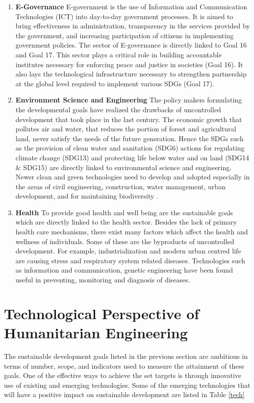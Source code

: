 \documentclass[10pt]{IETBook}
\begin{document}
\begin{enumerate}
 \item {\bf E-Governance} E-government is the use of Information and Communication Technologies (ICT) into day-to-day government processes. It is aimed to bring effectiveness in administration, transparency in the services provided by the government, and increasing participation of citizens in implementing government policies. The sector of E-governance is directly linked to Goal 16 and Goal 17. This sector plays a critical role in building accountable institutes necessary for enforcing peace and justice in societies (Goal 16). It also lays the technological infrastructure necessary to strengthen partnership at the global level required to implement various SDGs (Goal 17). \cite{ndou2004government,lim2016government}
 
 \item {\bf Environment Science and Engineering}
 The policy makers formulating the developmental goals have realized the drawbacks of uncontrolled development that took place in the last century. The economic growth that pollutes air and water, that reduces the portion of forest and agricultural land, never satisfy the needs of the future generation. Hence the SDGs such as the provision of clean water and sanitation (SDG6) actions for regulating climate change (SDG13) and protecting life below water and on land (SDG14 \& SDG15) are directly linked to environmental science and engineering. Newer clean and green technologies need to develop and adopted especially in the areas of civil engineering, construction, water management, urban development, and for maintaining biodiversity \cite{clayton2018sustainability}.

 \item {\bf Health}
 To provide good health and well being are the sustainable goals which are directly linked to the health sector. Besides the lack of primary health care mechanisms, there exist many factors which affect the health and wellness of individuals. Some of these are the byproducts of uncontrolled development. For example, industrialization and modern urban centred life are causing stress and respiratory system related diseases. Technologies such as information and communication, genetic engineering have been found useful in preventing, monitoring and diagnosis of diseases.\cite{deen2015information}
 
\end{enumerate}

\section{Technological Perspective of Humanitarian Engineering}
The sustainable development goals listed in the previous section are ambitious in terms of number, scope, and indicators used to measure the attainment of these goals. One of the effective ways to achieve the set targets is through innovative use of existing and emerging technologies. Some of the emerging technologies that will have a positive impact on sustainable development are listed in Table \ref{tech}
\end{document}
